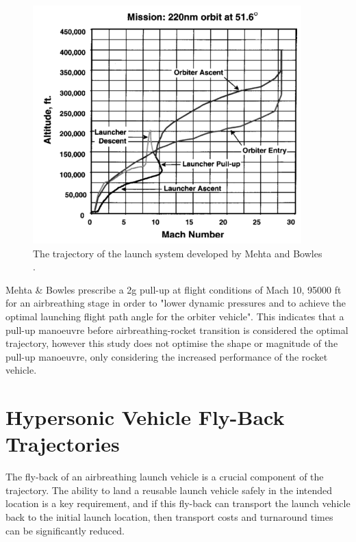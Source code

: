 \begin{figure}
\begin{minipage}[b]{0.6\textwidth}
		\includegraphics[width=\linewidth]{"figures/2_literature-review/Mehta Trajectory"}
		\caption{The trajectory of the launch system developed by Mehta and Bowles \cite{Mehta2001}.}
		\label{fig:MehtaTrajectory}
	\end{minipage}
	
\end{figure}
Mehta \& Bowles \cite{Mehta2001} prescribe a 2g pull-up at flight conditions of Mach 10, 95000 ft for an airbreathing stage in order to "lower dynamic pressures and to achieve the optimal launching flight path angle for the orbiter vehicle". This indicates that a pull-up manoeuvre before airbreathing-rocket transition is considered the optimal trajectory, however this study does not optimise the shape or magnitude of the pull-up manoeuvre, only considering the increased performance of the rocket vehicle. 



\section{Hypersonic Vehicle Fly-Back Trajectories}

The fly-back of an airbreathing launch vehicle is a crucial component of the trajectory. The ability to land a reusable launch vehicle safely in the intended location is a key requirement, and if this fly-back can transport the launch vehicle back to the initial launch location, then transport costs and turnaround times can be significantly reduced. 

